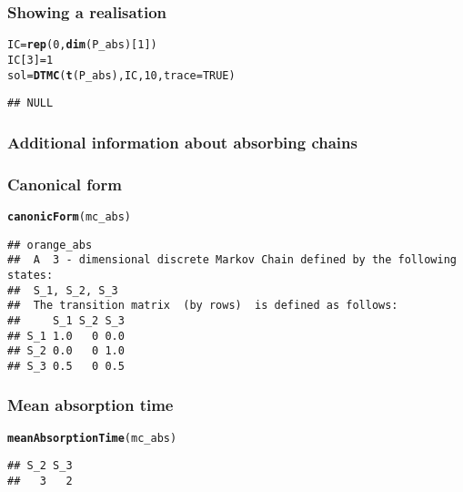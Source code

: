 \documentclass[aspectratio=169]{beamer}\usepackage[]{graphicx}\usepackage[]{xcolor}
\makeatletter
\newcommand{\hlnum}[1]{\textcolor[rgb]{0.686,0.059,0.569}{#1}}%
\newcommand{\hldef}[1]{\textcolor[rgb]{0.345,0.345,0.345}{#1}}%
\newcommand{\hlkwb}[1]{\textcolor[rgb]{0.69,0.353,0.396}{#1}}%
\newcommand{\hlkwc}[1]{\textcolor[rgb]{0.333,0.667,0.333}{#1}}%
\newcommand{\hlkwd}[1]{\textcolor[rgb]{0.737,0.353,0.396}{\textbf{#1}}}%
\newenvironment{kframe}{%
 \def\at@end@of@kframe{}%
 \ifinner\ifhmode%
  \def\at@end@of@kframe{\end{minipage}}%
  \begin{minipage}{\columnwidth}%
 \fi\fi%
 \def\FrameCommand##1{\hskip\@totalleftmargin \hskip-\fboxsep
 \colorbox{shadecolor}{##1}\hskip-\fboxsep
     \hskip-\linewidth \hskip-\@totalleftmargin \hskip\columnwidth}%
 \MakeFramed {\advance\hsize-\width
   \@totalleftmargin\z@ \linewidth\hsize
   \@setminipage}}%
 {\par\unskip\endMakeFramed%
 \at@end@of@kframe}
\newenvironment{knitrout}{}{} %
\makeatother
\begin{document}
  
\begin{frame}[fragile]\frametitle{Showing a realisation}
\begin{knitrout}
\color{fgcolor}\begin{kframe}
\begin{alltt}
\hldef{IC} \hlkwb{=} \hlkwd{rep}\hldef{(}\hlnum{0}\hldef{,} \hlkwd{dim}\hldef{(P_abs)[}\hlnum{1}\hldef{])}
\hldef{IC[}\hlnum{3}\hldef{]} \hlkwb{=} \hlnum{1}
\hldef{sol} \hlkwb{=} \hlkwd{DTMC}\hldef{(}\hlkwd{t}\hldef{(P_abs), IC,} \hlnum{10}\hldef{,} \hlkwc{trace}\hldef{=}\hlnum{TRUE}\hldef{)}
\end{alltt}
\begin{verbatim}
## NULL
\end{verbatim}
\end{kframe}
\end{knitrout}
\end{frame}


\begin{frame}\frametitle{Additional information about absorbing chains}
\vfill
{}
\vfill
{}
\vfill
{}
\end{frame}

\begin{frame}[fragile]\frametitle{Canonical form}
\begin{knitrout}
\color{fgcolor}\begin{kframe}
\begin{alltt}
\hlkwd{canonicForm}\hldef{(mc_abs)}
\end{alltt}
\begin{verbatim}
## orange_abs 
##  A  3 - dimensional discrete Markov Chain defined by the following states: 
##  S_1, S_2, S_3 
##  The transition matrix  (by rows)  is defined as follows: 
##     S_1 S_2 S_3
## S_1 1.0   0 0.0
## S_2 0.0   0 1.0
## S_3 0.5   0 0.5
\end{verbatim}
\end{kframe}
\end{knitrout}
\end{frame}

\begin{frame}[fragile]\frametitle{Mean absorption time}
\begin{knitrout}
\color{fgcolor}\begin{kframe}
\begin{alltt}
\hlkwd{meanAbsorptionTime}\hldef{(mc_abs)}
\end{alltt}
\begin{verbatim}
## S_2 S_3 
##   3   2
\end{verbatim}
\end{kframe}
\end{knitrout}
\end{frame}
\end{document}
